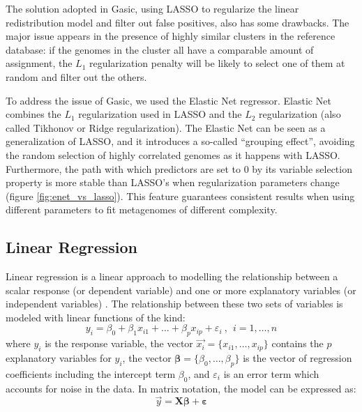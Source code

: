 The solution adopted in Gasic, using LASSO \cite{tibshirani_regression_1996} to regularize the linear redistribution model and filter out false positives, also has some drawbacks. The major issue appears in the presence of highly similar clusters in the reference database: if the genomes in the cluster all have a comparable amount of assignment, the $L_1$ regularization penalty will be likely to select one of them at random and filter out the others.

To address the issue of Gasic, we used the Elastic Net regressor. Elastic Net combines the $L_1$ regularization used in LASSO and the $L_2$ regularization (also called Tikhonov or Ridge regularization). The Elastic Net can be seen as a generalization of LASSO, and it introduces a so-called ``grouping effect'', avoiding the random selection of highly correlated genomes as it happens with LASSO. Furthermore, the path with which predictors are set to 0 by its variable selection property is more stable than LASSO's when regularization parameters change (figure \ref{fig:enet_vs_lasso}). This feature guarantees consistent results when using different parameters to fit metagenomes of different complexity.

\subsection{Linear Regression}

Linear regression is a linear approach to modelling the relationship between a scalar response (or dependent variable) and one or more explanatory variables (or independent variables) \cite{noauthor_linear_2018}. The relationship between these two sets of variables is modeled with linear functions of the kind:
\begin{equation*}
    y_i = \beta_0 + \beta_1 x_{i1} + \dots + \beta_p x_{ip} + \varepsilon_i ~,~~ i = 1, \dots , n
\end{equation*}
where $y_i$ is the response variable, the vector $\vec{x_i} = \{x_{i1}, \dots, x_{ip} \}$ contains the $p$ explanatory variables for $y_i$, the vector $\boldsymbol{\beta} = \{\beta_0, \dots, \beta_p \}$ is the vector of regression coefficients including the intercept term $\beta_0$, and $\varepsilon_i$ is an error term which accounts for noise in the data. In matrix notation, the model can be expressed as:
\begin{equation*}
    \vec{y} = \boldsymbol{X}\boldsymbol{\beta} + \boldsymbol{\varepsilon}
\end{equation*}

